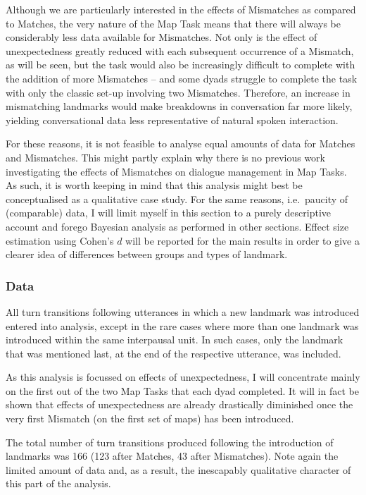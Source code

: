 Although we are particularly interested in the effects of Mismatches as compared to Matches, the very nature of the Map Task means that there will always be considerably less data available for Mismatches. Not only is the effect of unexpectedness greatly reduced with each subsequent occurrence of a Mismatch, as will be seen, but the task would also be increasingly difficult to complete with the addition of more Mismatches -- and some dyads struggle to complete the task with only the classic set-up involving two Mismatches. Therefore, an increase in mismatching landmarks would make breakdowns in conversation far more likely, yielding conversational data less representative of natural spoken interaction.

\hspace*{-1.5pt}For these reasons, it is not feasible to analyse equal amounts of data for Matches and Mismatches. This might partly explain why there is no previous work investigating the effects of Mismatches on dialogue management in Map Tasks. As such, it is worth keeping in mind that this analysis might best be conceptualised as a qualitative case study.
For the same reasons, i.e.~paucity of (comparable) data, I will limit myself in this section to a purely descriptive account and forego Bayesian analysis as performed in other sections. Effect size estimation using Cohen's \(d\) \citep{cohenStatisticalPowerAnalysis1988} will be reported for the main results in order to give a clearer idea of differences between groups and types of landmark.

\subsubsection{Data}\label{turntaking_results_mismatches_data}


All turn transitions following utterances in which a new landmark was introduced entered into analysis, except in the rare cases where more than one landmark was introduced within the same interpausal unit. In such cases, only the landmark that was mentioned last, at the end of the respective utterance, was included.

As this analysis is focussed on effects of unexpectedness, I will concentrate mainly on the first out of the two Map Tasks that each dyad completed. It will in fact be shown that effects of unexpectedness are already drastically diminished once the very first Mismatch (on the first set of maps) has been introduced.

The total number of turn transitions produced following the introduction of landmarks was 166 (123 after Matches, 43 after Mismatches). Note again the limited amount of data and, as a result, the inescapably qualitative character of this part of the analysis.



